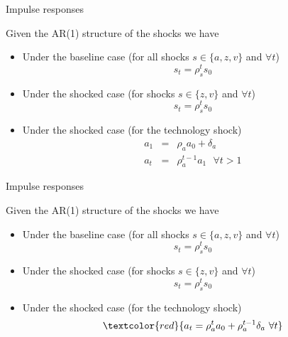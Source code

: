 \documentclass{beamer}
\begin{document}

	
\begin{frame}{Impulse responses}

Given the AR(1) structure of the shocks we have

\vspace{2mm}
\begin{itemize}
\item	Under the baseline case (for all shocks $s \in \{a,z,v \}$ and $\forall t$)
\[
s_{t} = \rho_{s}^{t} s_{0}
\]
\item	Under the shocked case (for shocks $s \in \{ z,v \}$ and $\forall t$)
\[
s_{t} = \rho_{s}^{t} s_{0}
\]
\item	Under the shocked case (for the technology shock)
\begin{eqnarray*}
a_{1} &=& \rho_{a} a_{0} + \delta_{a} \\
a_{t} &=& \rho_{a}^{t-1} a_{1} \text{  } \forall t>1
\end{eqnarray*}
\end{itemize}

\end{frame}


	
\begin{frame}{Impulse responses}

Given the AR(1) structure of the shocks we have

\vspace{2mm}
\begin{itemize}
\item	Under the baseline case (for all shocks $s \in \{a,z,v \}$ and $\forall t$)
\[
s_{t} = \rho_{s}^{t} s_{0}
\]
\item	Under the shocked case (for shocks $s \in \{ z,v \}$ and $\forall t$)
\[
s_{t} = \rho_{s}^{t} s_{0}
\]
\item	Under the shocked case (for the  technology shock)
\[
\textcolor{red}{a_{t}=\rho_{a}^{t} a_{0} + \rho_{a}^{t-1} \delta_{a} \text{  } \forall t}
\]
\end{itemize}

\end{frame}

\end{document}
